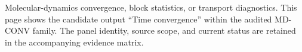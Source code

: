 Molecular-dynamics convergence, block statistics, or transport diagnostics. This page shows the candidate output ``Time convergence'' within the audited MD-CONV family. The panel identity, source scope, and current status are retained in the accompanying evidence matrix.
